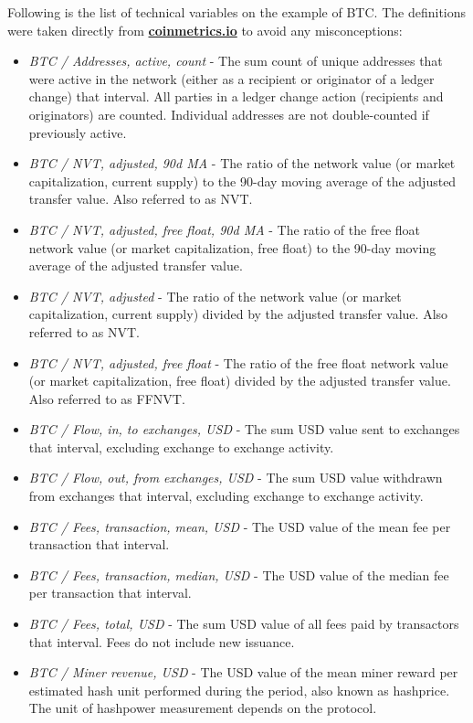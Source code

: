 Following is the list of technical variables on the example of \ac{BTC}. The definitions were taken
directly from \textbf{\href{https://charts.coinmetrics.io/crypto-data/}{coinmetrics.io}} to avoid any misconceptions:

\begin{itemize}
    \item \textit{BTC / Addresses, active, count} - The sum count of unique addresses that were active in the network (either as a recipient or originator of a ledger change) that interval. All parties in a ledger change action (recipients and originators) are counted. Individual addresses are not double-counted if previously active.
    \item \textit{BTC / NVT, adjusted, 90d MA} - The ratio of the network value (or market capitalization, current supply) to the 90-day moving average of the adjusted transfer value. Also referred to as NVT.
    \item \textit{BTC / NVT, adjusted, free float,  90d MA} - The ratio of the free float network value (or market capitalization, free float) to the 90-day moving average of the adjusted transfer value.
    \item \textit{BTC / NVT, adjusted} - The ratio of the network value (or market capitalization, current supply) divided by the adjusted transfer value. Also referred to as NVT.
    \item \textit{BTC / NVT, adjusted, free float} - The ratio of the free float network value (or market capitalization, free float) divided by the adjusted transfer value. Also referred to as FFNVT.
    \item \textit{BTC / Flow, in, to exchanges, USD} - The sum USD value sent to exchanges that interval, excluding exchange to exchange activity.
    \item \textit{BTC / Flow, out, from exchanges, USD} - The sum USD value withdrawn from exchanges that interval, excluding exchange to exchange activity.
    \item \textit{BTC / Fees, transaction, mean, USD} - The USD value of the mean fee per transaction that interval.
    \item \textit{BTC / Fees, transaction, median, USD} - The USD value of the median fee per transaction that interval.
    \item \textit{BTC / Fees, total, USD} - The sum USD value of all fees paid by transactors that interval. Fees do not include new issuance.
    \item \textit{BTC / Miner revenue, USD} - The USD value of the mean miner reward per estimated hash unit performed during the period, also known as hashprice. The unit of hashpower measurement depends on the protocol.

\end{itemize}
